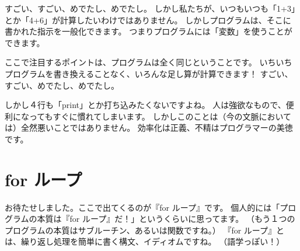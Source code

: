 \documentclass[dvipdfmx,autodetect-engine,10pt,b5paper,papersize,openany,dvipsnames]{jsbook}
\begin{document}
\begin{multicols}{2}
\vspace{1.5cm}

\noindent
すごい、すごい、めでたし、めでたし。
しかし私たちが、いつもいつも「1+3」とか「4+6」が計算したいわけではありません。
しかしプログラムは、そこに書かれた指示を一般化できます。
つまりプログラムには「変数」を使うことができます。


\vspace{1.5cm}

\noindent
ここで注目するポイントは、プログラムは全く同じということです。
いちいちプログラムを書き換えることなく、いろんな足し算が計算できます！
すごい、すごい、めでたし、めでたし。

しかし４行も「print」とか打ち込みたくないですよね。
人は強欲なもので、便利になってもすぐに慣れてしまいます。
しかしこのことは（今の文脈においては）全然悪いことではありません。
効率化は正義、不精はプログラマーの美徳です。


\section*{for ループ}
お待たせしました。ここで出てくるのが『for ループ』です。
個人的には「プログラムの本質は『for ループ』だ！」というくらいに思ってます。
（もう１つのプログラムの本質はサブルーチン、あるいは関数ですね。）
『for ループ』とは、繰り返し処理を簡単に書く構文、イディオムですね。
（語学っぽい！）


\vspace{1.5cm}


\end{multicols}
\end{document}
